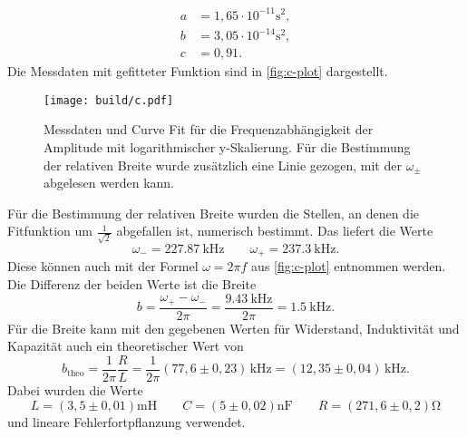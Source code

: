 \begin{align}
	a &= 1,65 \cdot 10^{-11} \si{\second^2}, \\
	b &= 3,05 \cdot 10^{-14} \si{\second^2}, \\
	c &= 0,91.
\end{align}
Die Messdaten mit gefitteter Funktion sind in \autoref{fig:c-plot} dargestellt.
\begin{figure}
	\centering
	\texttt{[image: build/c.pdf]}
	\caption{Messdaten und Curve Fit für die Frequenzabhängigkeit der Amplitude mit
		logarithmischer y-Skalierung. Für
	die Bestimmung der relativen Breite wurde zusätzlich eine Linie gezogen, mit der
	$\omega_{\pm}$ abgelesen werden kann.}
	\label{fig:c-plot}
\end{figure}
Für die Bestimmung der relativen Breite wurden die Stellen, an denen die Fitfunktion um
$\frac{1}{\sqrt 2}$ abgefallen ist, numerisch bestimmt. Das liefert die Werte
\begin{equation}
	\omega_- = \SI{227.87}{\kilo\hertz}
	\qquad
	\omega_+ = \SI{237.3}{\kilo\hertz}.
\end{equation}
Diese können auch mit der Formel $\omega = 2\pi f$ aus \autoref{fig:c-plot} entnommen
werden. Die Differenz der beiden Werte ist die Breite
\begin{equation}
	b = \frac{\omega_+ - \omega_-}{2\pi} = \frac{\SI{9.43}{\kilo\hertz}}{2\pi}
	= \SI{1.5}{\kilo\hertz}.
\end{equation}
Für die Breite kann mit den gegebenen Werten für Widerstand, Induktivität und Kapazität
auch ein theoretischer Wert von 
\begin{equation}
	b_\text{theo} = \frac{1}{2\pi} \frac{R}{L} 
	= \frac{1}{2\pi}(77,6 \pm 0,23)	\,\si{\kilo\hertz}
	= (12,35 \pm 0,04) \,\si{\kilo\hertz}.
\end{equation}
Dabei wurden die Werte
\begin{equation}
	L = (3,5 \pm 0,01) \si{\milli\henry} \qquad
	C = (5 \pm 0,02) \si{\nano\farad} \qquad
	R = (271,6 \pm 0,2) \si{\ohm}
\end{equation}
und lineare Fehlerfortpflanzung verwendet.
